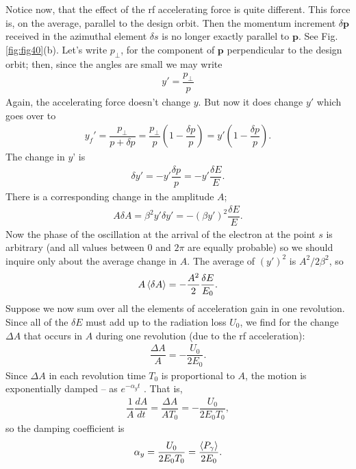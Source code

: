 Notice now, that the effect of the rf accelerating force is quite different. This force is, on the average, parallel to the design orbit. Then the momentum increment $\delta\bm{p}$ received in the azimuthal element $\delta s$ is no longer exactly parallel to $\bm{p}$. See Fig. \ref{fig:fig40}(b). Let's write $p_\perp$, for the component of $\bm{p}$ perpendicular to the design orbit; then, since the angles are small we may write
\begin{align}
	y' = \dfrac{p_\perp}{p}
\end{align}
Again, the accelerating force doesn't change $y$. But now it does change $y'$ which goes over to
\begin{align}
	y_{f}' = \dfrac{p_\perp}{p + \delta p} = \dfrac{p_\perp}{p} \left( 1 - \dfrac{\delta p}{p} \right) = y' \left( 1 - \dfrac{\delta p}{p} \right).
\end{align}
The change in $y’$ is
\begin{align}
	\delta y' = -y' \dfrac{\delta p}{p} = -y' \dfrac{\delta E}{E}.
\end{align}
There is a corresponding change in the amplitude $A$;
\begin{align}
	A \delta A = \beta^2 y' \delta y' = -(\beta y')^2 \dfrac{\delta E}{E}.
\end{align}
Now the phase of the oscillation at the arrival of the electron at the point $s$ is arbitrary
 (and all values between $0$ and $2\pi$ are equally probable) so we should inquire only about the average change in $A$. The average of $(y')^2$ is $A^2/2\beta^2$, so
\begin{align}
	A \left< \delta A \right> = - \dfrac{A^2}{2} \dfrac{\delta E}{E_0}.
\end{align}
Suppose we now sum over all the elements of acceleration gain in one revolution. Since all of the $\delta E$ must add up to the radiation loss $U_0$, we find for the change $\Delta A$ that occurs in $A$ during one revolution (due to the rf acceleration):
\begin{align}
	\dfrac{\Delta A}{A} = - \dfrac{U_0}{2 E_0}.
\end{align}
Since $\Delta A$ in each revolution time $T_0$ is proportional to $A$, the motion is exponentially damped -- as $e^{-\alpha_y t}$ . That is,
\begin{align} \label{eq:4.31}
	\dfrac{1}{A} \dfrac{dA}{dt} = \dfrac{\Delta A}{A T_0} = - \dfrac{U_0}{2 E_0 T_0},
\end{align}
so the damping coefficient is
\begin{align}
	\alpha_y = \dfrac{U_0}{2 E_0 T_0} = \dfrac{\left< P_\gamma \right>}{2 E_0}.
\end{align}

